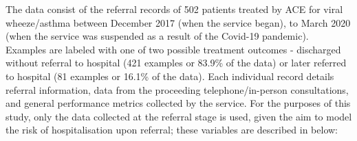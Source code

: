 The data consist of the referral records of 502 patients treated by ACE for viral wheeze/asthma between December 2017 (when the service began), to March 2020 (when the service was suspended as a result of the Covid-19 pandemic).
Examples are labeled with one of two possible treatment outcomes - discharged without referral to hospital (421 examples or 83.9\% of the data) or later referred to hospital (81 examples or 16.1\% of the data).
Each individual record details referral information, data from the proceeding telephone/in-person consultations, and general performance metrics collected by the service.
For the purposes of this study, only the data collected at the referral stage is used, given the aim to model the risk of hospitalisation upon referral; these variables are described in  below:

